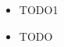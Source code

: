 \documentclass[12pt]{article}
\title{}
\author{}
\begin{document}
\begin{itemize}
  \item TODO1 
  \item TODO
\end{itemize}
\newpage




\tableofcontents
\newpage

\section{}\label{}

\subsection{}\label{}

\newpage

\end{document}
